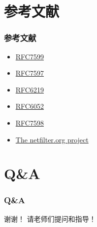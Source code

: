 \documentclass{beamer}
\begin{document}
\section{参考文献}
\begin{frame}
  \frametitle{参考文献}
  \begin{itemize}
  \item \href{https://tools.ietf.org/html/rfc7599}{RFC7599}
  \item \href{https://tools.ietf.org/html/rfc7597}{RFC7597}
  \item \href{https://tools.ietf.org/html/rfc6219}{RFC6219}
  \item \href{https://tools.ietf.org/html/rfc6052}{RFC6052}
  \item \href{https://tools.ietf.org/html/rfc7598}{RFC7598}
  \item \href{http://www.netfilter.org}{The netfilter.org project}
  \end{itemize}
\end{frame}

\section{Q\&A}

\begin{frame}
  \frametitle{Q\&A}
  \begin{center}
    {\LARGE 谢谢！}
    \vspace{3em}
    {\LARGE 请老师们提问和指导！}
  \end{center}
\end{frame}
\end{document}
